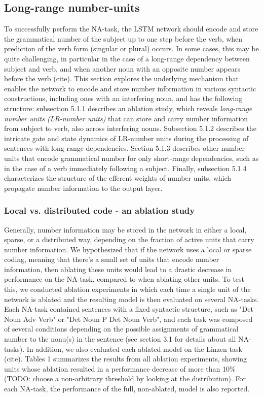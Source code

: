 \subsection{Long-range number-units}
To successfully perform the NA-task, the LSTM network should encode and store the grammatical number of the subject up to one step before the verb, when prediction of the verb form (singular or plural) occurs. In some cases, this may be quite challenging, in particular in the case of a long-range dependency between subject and verb, and when another noun with an opposite number appears before the verb (cite). This section explores the underlying mechanism that enables the network to encode and store number information in various syntactic constructions, including ones with an interfering noun, and has the following structure: subsection 5.1.1 describes an ablation study, which reveals \textit{long-range number units (LR-number units)} that can store and carry number information from subject to verb, also across interfering nouns. Subsection 5.1.2 describes the intricate gate and state dynamics of LR-number units during the processing of sentences with long-range dependencies. Section 5.1.3 describes other number units that encode grammatical number for only short-range dependencies, such as in the case of a verb immediately following a subject. Finally, subsection 5.1.4 characterizes the structure of the efferent weights of number units, which propagate number information to the output layer.

\subsubsection{Local vs. distributed code - an ablation study}
Generally, number information may be stored in the network in either a local, sparse, or a distributed way, depending on the fraction of active units that carry number information. We hypothesized that if the network uses a local or sparse coding, meaning that there's a small set of units that encode number information, then ablating these units would lead to a drastic decrease in performance on the NA-task, compared to when ablating other units. To test this, we conducted ablation experiments in which each time a single unit of the network is ablated and the resulting model is then evaluated on several NA-tasks. Each NA-task contained sentences with a fixed syntactic structure, such as "Det Noun Adv Verb" or "Det Noun P Det Noun Verb", and each task was composed of several conditions depending on the possible assignments of grammatical number to the nonu(s) in the sentence (see section 3.1 for details about all NA-tasks). In addition, we also evaluated each ablated model on the Linzen task (cite). Tables 1 summarizes the results from all ablation experiments, showing units whose ablation resulted in a performance decrease of more than 10\% (TODO: choose a non-arbitrary threshold by looking at the distribution). For each NA-task, the performance of the full, non-ablated, model is also reported.


